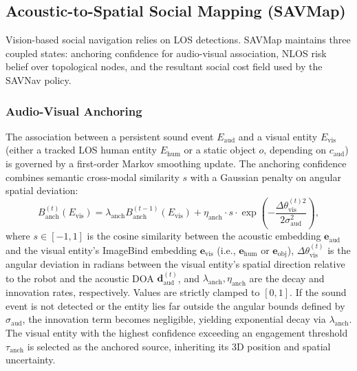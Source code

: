 \subsection{Acoustic-to-Spatial Social Mapping (SAVMap)}
\label{subsec:savmap}

Vision-based social navigation relies on LOS detections. SAVMap maintains three coupled states: anchoring confidence for audio-visual association, NLOS risk belief over topological nodes, and the resultant social cost field used by the SAVNav policy.

\subsubsection{Audio-Visual Anchoring}
The association between a persistent sound event $E_{\mathrm{aud}}$ and a visual entity $E_{\mathrm{vis}}$ (either a tracked LOS human entity $E_{\mathrm{hum}}$ or a static object $o$, depending on $c_{\mathrm{aud}}$) is governed by a first-order Markov smoothing update. The anchoring confidence combines semantic cross-modal similarity $s$ with a Gaussian penalty on angular spatial deviation:
\begin{equation}
    B_{\mathrm{anch}}^{(t)}(E_{\mathrm{vis}}) = \lambda_{\mathrm{anch}} B_{\mathrm{anch}}^{(t-1)}(E_{\mathrm{vis}}) + \eta_{\mathrm{anch}} \cdot s \cdot \exp\left(-\frac{\Delta\theta_\mathrm{vis}^{(t)2}}{2\sigma_{\mathrm{aud}}^2}\right),
    \label{eq:anch_update}
\end{equation}
where $s \in [-1, 1]$ is the cosine similarity between the acoustic embedding $\mathbf{e}_{\mathrm{aud}}$ and the visual entity's ImageBind embedding $\mathbf{e}_{\mathrm{vis}}$ (i.e., $\mathbf{e}_{\mathrm{hum}}$ or $\mathbf{e}_{\mathrm{obj}}$), \allowbreak$\Delta\theta_\mathrm{vis}^{(t)}$ is the angular deviation in radians between the visual entity's spatial direction relative to the robot and the acoustic DOA $\mathbf{d}_{\mathrm{aud}}^{(t)}$, and $\lambda_{\mathrm{anch}}, \eta_{\mathrm{anch}}$ are the decay and innovation rates, respectively. Values are strictly clamped to $[0,1]$. If the sound event is not detected or the entity lies far outside the angular bounds defined by $\sigma_{\mathrm{aud}}$, the innovation term becomes negligible, yielding exponential decay via $\lambda_{\mathrm{anch}}$. The visual entity with the highest confidence exceeding an engagement threshold $\tau_{\mathrm{anch}}$ is selected as the anchored source, inheriting its 3D position and spatial uncertainty.

